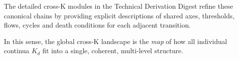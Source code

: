 The detailed cross-K modules in the Technical Derivation Digest refine these
canonical chains by providing explicit descriptions of shared axes,
thresholds, flows, cycles and death conditions for each adjacent transition.

In this sense, the global cross-K landscape is the \emph{map} of how all
individual continua $K_d$ fit into a single, coherent, multi-level
structure.
